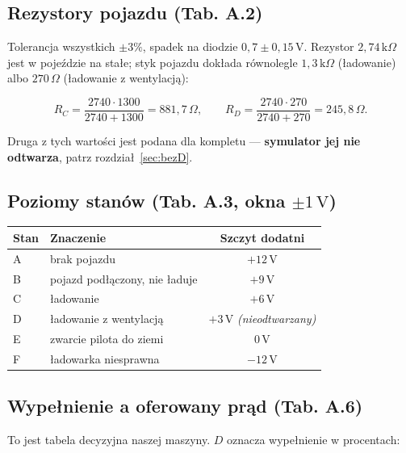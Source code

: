 \documentclass[a4paper,11pt]{article}
\newcommand{\ohm}{\,\Omega}
\newcommand{\kohm}{\,\mathrm{k}\Omega}
\newcommand{\volt}{\,\mathrm{V}}
\begin{document}
\subsection{Rezystory pojazdu (Tab. A.2)}

Tolerancja wszystkich $\pm 3\%$, spadek na diodzie $0{,}7 \pm 0{,}15\volt$.
Rezystor $2{,}74\kohm$ jest w pojeździe na stałe; styk pojazdu dokłada równolegle
$1{,}3\kohm$ (ładowanie) albo $270\ohm$ (ładowanie z wentylacją):

\[
R_{C}=\frac{2740\cdot 1300}{2740+1300}=881{,}7\ohm,
\qquad
R_{D}=\frac{2740\cdot 270}{2740+270}=245{,}8\ohm .
\]

Druga z tych wartości jest podana dla kompletu --- \textbf{symulator jej nie odtwarza},
patrz rozdział~\ref{sec:bezD}.

\subsection{Poziomy stanów (Tab. A.3, okna \texorpdfstring{$\pm 1\volt$}{+/-1 V})}

\begin{center}
\begin{tabular}{llc}
\toprule
Stan & Znaczenie & Szczyt dodatni \\
\midrule
A & brak pojazdu & $+12\volt$ \\
B & pojazd podłączony, nie ładuje & $+9\volt$ \\
C & ładowanie & $+6\volt$ \\
D & ładowanie z wentylacją & $+3\volt$ \quad \emph{(nieodtwarzany)} \\
E & zwarcie pilota do ziemi & $0\volt$ \\
F & ładowarka niesprawna & $-12\volt$ \\
\bottomrule
\end{tabular}
\end{center}

\subsection{Wypełnienie a oferowany prąd (Tab. A.6)}

To jest tabela decyzyjna naszej maszyny. $D$ oznacza wypełnienie w procentach:
\end{document}
